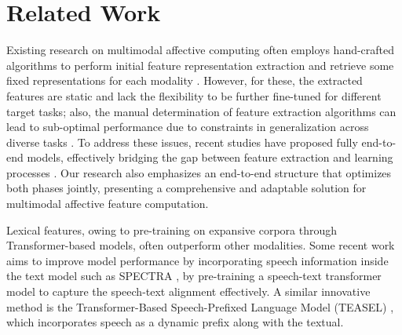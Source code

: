 \documentclass[11pt]{article}
\begin{document}
\section{Related Work}
Existing research on multimodal affective computing often employs hand-crafted algorithms to perform initial feature representation extraction and retrieve some fixed representations for each modality \cite{Shenoy_2020}. \cite{delbrouck-etal-2020-transformer} However, for these, the extracted features are static and lack the flexibility to be further fine-tuned for different target tasks; also, the manual determination of feature extraction algorithms can lead to sub-optimal performance due to constraints in generalization across diverse tasks \cite{dai-etal-2021-multimodal}. 
To address these issues, recent studies have proposed fully end-to-end models, effectively bridging the gap between feature extraction and learning processes \cite{dai-etal-2021-multimodal} \cite{10.1145/3366423.3380000}. Our research also emphasizes an end-to-end structure that optimizes both phases jointly, presenting a comprehensive and adaptable solution for multimodal affective feature computation.

Lexical features, owing to pre-training on expansive corpora through Transformer-based models, often outperform other modalities. Some recent work aims to improve model performance by incorporating speech information inside the text model such as SPECTRA \cite{yu2023speechtext}, by pre-training a speech-text transformer model to capture the speech-text alignment effectively.  A similar innovative method is the Transformer-Based Speech-Prefixed Language Model (TEASEL) \cite{arjmand2021teasel}, which incorporates speech as a dynamic prefix along with the textual.

\end{document}
